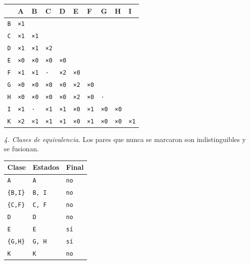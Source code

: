\documentclass[11pt]{article}
\begin{document}
\begin{center}\footnotesize\begin{tabular}{llllllllll}\toprule
 & A & B & C & D & E & F & G & H & I \\\midrule
\texttt{B} & \texttt{×1} & \texttt{} & \texttt{} & \texttt{} & \texttt{} & \texttt{} & \texttt{} & \texttt{} & \texttt{} \\
\texttt{C} & \texttt{×1} & \texttt{×1} & \texttt{} & \texttt{} & \texttt{} & \texttt{} & \texttt{} & \texttt{} & \texttt{} \\
\texttt{D} & \texttt{×1} & \texttt{×1} & \texttt{×2} & \texttt{} & \texttt{} & \texttt{} & \texttt{} & \texttt{} & \texttt{} \\
\texttt{E} & \texttt{×0} & \texttt{×0} & \texttt{×0} & \texttt{×0} & \texttt{} & \texttt{} & \texttt{} & \texttt{} & \texttt{} \\
\texttt{F} & \texttt{×1} & \texttt{×1} & \texttt{·} & \texttt{×2} & \texttt{×0} & \texttt{} & \texttt{} & \texttt{} & \texttt{} \\
\texttt{G} & \texttt{×0} & \texttt{×0} & \texttt{×0} & \texttt{×0} & \texttt{×2} & \texttt{×0} & \texttt{} & \texttt{} & \texttt{} \\
\texttt{H} & \texttt{×0} & \texttt{×0} & \texttt{×0} & \texttt{×0} & \texttt{×2} & \texttt{×0} & \texttt{·} & \texttt{} & \texttt{} \\
\texttt{I} & \texttt{×1} & \texttt{·} & \texttt{×1} & \texttt{×1} & \texttt{×0} & \texttt{×1} & \texttt{×0} & \texttt{×0} & \texttt{} \\
\texttt{K} & \texttt{×2} & \texttt{×1} & \texttt{×1} & \texttt{×1} & \texttt{×0} & \texttt{×1} & \texttt{×0} & \texttt{×0} & \texttt{×1} \\
\bottomrule\end{tabular}\end{center}
\textit{4. Clases de equivalencia.} Los pares que nunca se marcaron son indistinguibles y se fusionan.
\begin{center}\footnotesize\begin{tabular}{lll}\toprule
Clase & Estados & Final \\\midrule
\texttt{A} & \texttt{A} & \texttt{no} \\
\texttt{\{B,I\}} & \texttt{B, I} & \texttt{no} \\
\texttt{\{C,F\}} & \texttt{C, F} & \texttt{no} \\
\texttt{D} & \texttt{D} & \texttt{no} \\
\texttt{E} & \texttt{E} & \texttt{sí} \\
\texttt{\{G,H\}} & \texttt{G, H} & \texttt{sí} \\
\texttt{K} & \texttt{K} & \texttt{no} \\
\bottomrule\end{tabular}\end{center}
\end{document}
